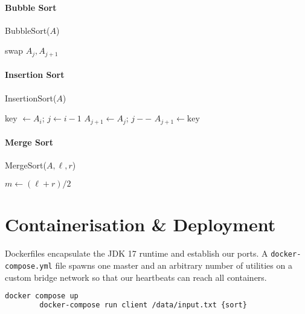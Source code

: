 \documentclass{article}
\begin{document}
	\paragraph{Bubble Sort}
	\begin{algorithm}[H]
		\caption{BubbleSort($A$)}
		\begin{algorithmic}[1]
			\State swap $A_j, A_{j+1}$
			\EndIf
			\EndFor
			\EndFor
		\end{algorithmic}
	\end{algorithm}
	
	\paragraph{Insertion Sort}
	\begin{algorithm}[H]
		\caption{InsertionSort($A$)}
		\begin{algorithmic}[1]
			\State key $\gets A_i$; $j \gets i - 1$
			\State $A_{j+1} \gets A_j$; $j--$
			\EndWhile
			\State $A_{j+1} \gets \text{key}$
			\EndFor
		\end{algorithmic}
	\end{algorithm}
	
	\paragraph{Merge Sort}
	\begin{algorithm}[H]
		\caption{MergeSort($A, \ell, r$)}
		\begin{algorithmic}[1]
			\State $m \gets (\ell + r)/2$
			\State {}
			\State {}
			\State {}
			\EndIf
		\end{algorithmic}
	\end{algorithm}
	
	\section{Containerisation \& Deployment}
	Dockerfiles encapsulate the JDK 17 runtime and establish our ports. A \texttt{docker-compose.yml} file spawns one master and an arbitrary number of utilities on a custom bridge network so that our heartbeats can reach all containers.
	\begin{lstlisting}[language=bash, basicstyle=\ttfamily\footnotesize]
		docker compose up
		docker-compose run client /data/input.txt {sort}
	\end{lstlisting}
	
\end{document}
